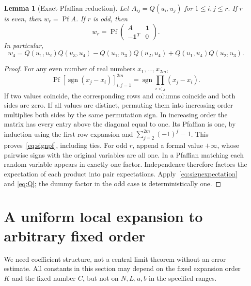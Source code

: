 \documentclass[11pt]{article}
\newtheorem{lemma}[theorem]{Lemma}
\theoremstyle{remark}
\DeclareMathOperator{\Pf}{Pf}
\DeclareMathOperator{\sgn}{sgn}
\begin{document}
\begin{lemma}[Exact Pfaffian reduction]\label{lem:pf}
Let $A_{ij}=Q(u_i,u_j)$ for $1\le i,j\le r$. If $r$ is even, then
$w_r=\Pf A$. If $r$ is odd, then
\begin{equation}\label{eq:augmented}
 w_r=\Pf\begin{pmatrix}A&\mathbf 1\\-\mathbf 1^T&0\end{pmatrix}.
\end{equation}
In particular,
\begin{equation}\label{eq:pf4}
 w_4=Q(u_1,u_2)Q(u_3,u_4)-Q(u_1,u_3)Q(u_2,u_4)
                         +Q(u_1,u_4)Q(u_2,u_3).
\end{equation}
\end{lemma}
\begin{proof}
For any even number of real numbers $x_1,\ldots,x_{2m}$,
\begin{equation}\label{eq:signpf}
 \Pf[\sgn(x_j-x_i)]_{i,j=1}^{2m}
   =\sgn\prod_{i<j}(x_j-x_i).
\end{equation}
If two values coincide, the corresponding rows and columns coincide and both
sides are zero. If all values are distinct, permuting them into increasing order
multiplies both sides by the same permutation sign. In increasing order the
matrix has every entry above the diagonal equal to one. Its Pfaffian is one,
by induction using the first-row expansion and
$\sum_{j=2}^{2m}(-1)^j=1$. This proves~\eqref{eq:signpf}, including ties.
For odd $r$, append a formal value $+\infty$, whose pairwise signs with the
original variables are all one. In a Pfaffian matching each random variable
appears in exactly one factor. Independence therefore factors the expectation
of each product into pair expectations. Apply~\eqref{eq:signexpectation} and
\eqref{eq:Q}; the dummy factor in the odd case is deterministically one.
\end{proof}

\section{A uniform local expansion to arbitrary fixed order}

We need coefficient structure, not a central limit theorem without an error
estimate. All constants in this section may depend on the fixed expansion order
$K$ and the fixed number $C$, but not on $N,L,a,b$ in the specified ranges.
\end{document}
